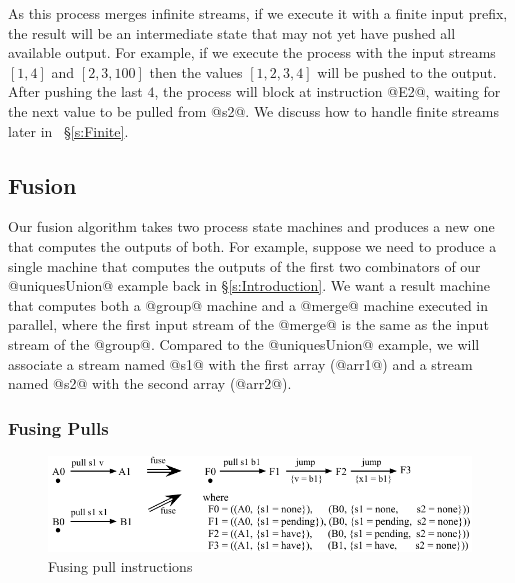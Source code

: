 As this process merges infinite streams, if we execute it with a finite input prefix, the result will be an intermediate state that may not yet have pushed all available output.
For example, if we execute the process with the input streams $[1, 4]$ and $[2, 3, 100]$ then the values $[1, 2, 3, 4]$ will be pushed to the output.
After pushing the last $4$, the process will block at instruction @E2@, waiting for the next value to be pulled from @s2@.
We discuss how to handle finite streams later in ~\S\ref{s:Finite}.




\clearpage{}
\subsection{Fusion}
Our fusion algorithm takes two process state machines and produces a new one that computes the outputs of both.
For example, suppose we need to produce a single machine that computes the outputs of the first two combinators of our @uniquesUnion@ example back in \S\ref{s:Introduction}.
We want a result machine that computes both a @group@ machine and a @merge@ machine executed in parallel, where the first input stream of the @merge@ is the same as the input stream of the @group@.
Compared to the @uniquesUnion@ example, we will associate a stream named @s1@ with the first array (@arr1@) and a stream named @s2@ with the second array (@arr2@). 


\subsubsection{Fusing Pulls}
\begin{figure}
\includegraphics[scale=1.1]{figures/fuse-pull-pull.pdf}
\caption{Fusing pull instructions}
\label{fig:Fusion:Pulls}
\end{figure}

